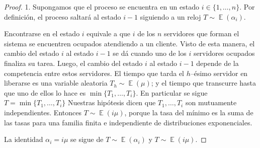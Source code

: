 \documentclass{article}
\DeclareMathOperator{\Exp}{\mathbb{E}}
\theoremstyle{definition}
\begin{document}
\begin{proof} 1.
Supongamos que el proceso se encuentra en un estado \(i \in \{1, \dots, n\}\).
Por definición, el proceso saltará al estado \(i - 1\) siguiendo a un reloj \(T \sim \Exp(\alpha_i)\).

Encontrarse en el estado \(i\) equivale a que \(i\) de los \(n\) servidores que forman el sistema se encuentren ocupados atendiendo a un cliente.
Visto de esta manera, el cambio del estado \(i\) al estado \(i - 1\) se dá cuando uno de los \(i\) servidores ocupados finaliza su tarea.
Luego, el cambio del estado \(i\) al estado \(i - 1\) depende de la competencia entre estos servidores.
El tiempo que tarda el \(h\)--ésimo servidor en liberarse es una variable aleatoria \(T_h \sim \Exp(\mu)\);
y el tiempo que transcurre hasta que uno de ellos lo hace es \(\min \{T_1, \dots, T_i\}\).
En particular se sigue \(T = \min \{T_1, \dots, T_i\}\)
Nuestras hipótesis dicen que \(T_1, \dots, T_i\) son mutuamente independientes.
Entonces \(T \sim \Exp(i \mu)\), porque la tasa del mínimo es la suma de las tasas para una familia finita e independiente de distribuciones exponenciales.

La identidad \(\alpha_i  = i \mu\) se sigue de \(T \sim \Exp(\alpha_i)\) y \(T \sim \Exp(i \mu)\).
\end{proof}

\end{document}
